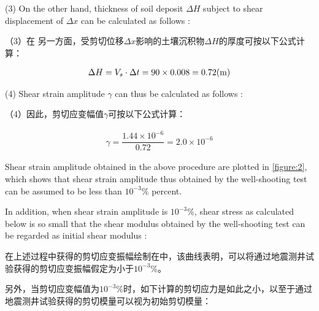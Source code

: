 \begin{paracol}{2}    

    (3) On the other hand, thickness of soil deposit $\Delta{}H$ subject to shear displacement of $\Delta{}x$ can be calculated as follows :

    \switchcolumn
    
    （3）在 另一方面，受剪切位移$\Delta{}x$影响的土壤沉积物$\Delta{}H$的厚度可按以下公式计算：

\end{paracol}

\begin{align}
    \Delta{}H=V_s\cdot{}\Delta{}t=90\times{}0.008=0.72(\rm{m})
    \label{equation:3}
\end{align}

\begin{paracol}{2}

    (4) Shear strain amplitude $\gamma$ can thus be calculated as follows :

    \switchcolumn
    
    （4）因此，剪切应变幅值$\gamma$可按以下公式计算：

\end{paracol}

\begin{align}
    \gamma=\dfrac{1.44\times{}10^{-6}}{0.72}=2.0\times{}10^{-6}
    \label{equation:4}
\end{align}

\begin{paracol}{2}

    Shear strain amplitude obtained in the above procedure are plotted in \autoref{figure:2}, which shows that shear strain amplitude thus obtained by the well-shooting test can be assumed to be less than $10^{-3}\%$ percent.
    
    In addition, when shear strain amplitude is $10^{-3}\%$, shear stress as calculated below is so small that the shear modulus obtained by the well-shooting test can be regarded as initial shear modulus :

    \switchcolumn

    在上述过程中获得的剪切应变振幅绘制在中，该曲线表明，可以将通过地震测井试验获得的剪切应变振幅假定为小于$10^{-3}\%$。
    
    另外，当剪切应变幅值为$10^{-3}\%$时，如下计算的剪切应力是如此之小，以至于通过地震测井试验获得的剪切模量可以视为初始剪切模量：

\end{paracol}

